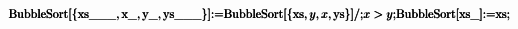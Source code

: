 \documentclass{article}
\begin{document}
\begin{doublespace}
\noindent\(\pmb{\text{BubbleSort}[\{\text{xs$\_\_\_$},\text{x$\_$},\text{y$\_$},\text{ys$\_\_\_$}\}]\text{:=}\text{BubbleSort}[\{\text{xs},y,x,\text{ys}\}]\text{/;}x>y;}\\
\pmb{\text{BubbleSort}[\text{xs$\_$}]\text{:=}\text{xs};}\)
\end{doublespace}
\end{document}
